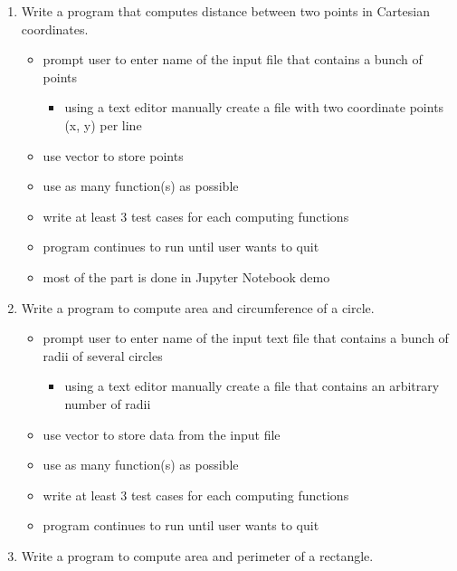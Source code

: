 \documentclass[11pt]{article}
\providecommand{\tightlist}{%
      \setlength{\itemsep}{0pt}\setlength{\parskip}{0pt}}
\begin{document}
\begin{enumerate}
\def\labelenumi{\arabic{enumi}.}
\tightlist
\item
  Write a program that computes distance between two points in Cartesian
  coordinates.

  \begin{itemize}
  \tightlist
  \item
    prompt user to enter name of the input file that contains a bunch of
    points

    \begin{itemize}
    \tightlist
    \item
      using a text editor manually create a file with two coordinate
      points (x, y) per line
    \end{itemize}
  \item
    use vector to store points
  \item
    use as many function(s) as possible
  \item
    write at least 3 test cases for each computing functions
  \item
    program continues to run until user wants to quit
  \item
    most of the part is done in Jupyter Notebook demo
  \end{itemize}
\item
  Write a program to compute area and circumference of a circle.

  \begin{itemize}
  \tightlist
  \item
    prompt user to enter name of the input text file that contains a
    bunch of radii of several circles

    \begin{itemize}
    \tightlist
    \item
      using a text editor manually create a file that contains an
      arbitrary number of radii
    \end{itemize}
  \item
    use vector to store data from the input file
  \item
    use as many function(s) as possible
  \item
    write at least 3 test cases for each computing functions
  \item
    program continues to run until user wants to quit
  \end{itemize}
\item
  Write a program to compute area and perimeter of a rectangle.


\end{enumerate}
\end{document}
